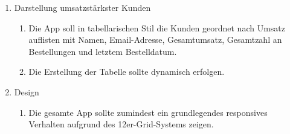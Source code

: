 \begin{enumerate}
\begin{enumerate}
\end{enumerate}
\item Darstellung umsatzstärkster Kunden
\begin{enumerate}
\item Die App soll in tabellarischen Stil die Kunden geordnet nach Umsatz auflisten mit Namen, Email-Adresse, Gesamtumsatz, Gesamtzahl an Bestellungen und letztem Bestelldatum.
\item Die Erstellung der Tabelle sollte dynamisch erfolgen.
\end{enumerate}
\item Design
\begin{enumerate}
\item Die gesamte App sollte zumindest ein grundlegendes responsives Verhalten aufgrund des 12er-Grid-Systems zeigen.
\end{enumerate}
\end{enumerate}



